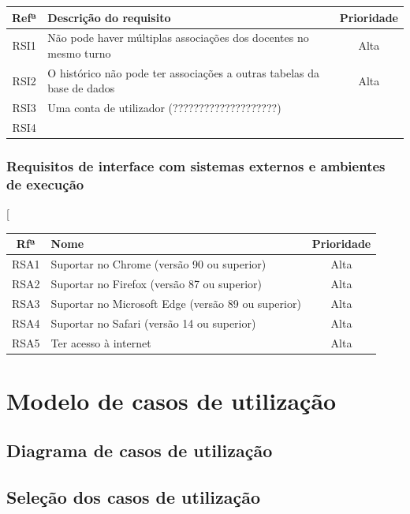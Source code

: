 \documentclass[11pt, twoside]{report}
\begin{document}
	
	\begin{center}	
	\begin{tabularx}{\textwidth}{|c|X|c|}
		\hline
		\textbf{Refª }	& \textbf{Descrição do requisito} & \textbf{Prioridade} \\
		\hline
		RSI1 &Não pode haver múltiplas associações dos docentes no mesmo turno &Alta\\
		\hline
		RSI2 &O histórico não pode ter associações a outras tabelas da base de dados  &Alta\\
		\hline
		RSI3 & Uma conta de utilizador (????????????????????)&\\
		\hline
		RSI4 & &\\
		\hline
	\end{tabularx}
	\label{requisitosdeseguranca}
\end{center}
	
	\subsection{Requisitos de interface com sistemas externos e ambientes de execução}
		\begin{center}[
		\begin{tabularx}{\textwidth}{|c|X|c|}
			\hline
			Rfª & Nome & Prioridade\\
			\hline
			RSA1 & Suportar no Chrome (versão 90 ou superior) &Alta\\
			\hline
			RSA2 &Suportar no Firefox (versão 87 ou superior) &Alta\\
			\hline
			RSA3 &Suportar no Microsoft Edge (versão 89 ou superior)&Alta\\
			\hline
			RSA4 &Suportar no Safari (versão 14 ou superior)&Alta\\
			\hline
			RSA5 &Ter acesso à internet&Alta\\
			\hline
		\end{tabularx}
		\label{requisitosdesistemas}
	\end{center}
	
	\chapter{Modelo de casos de utilização}
	\section{Diagrama de casos de utilização}
	\section{Seleção dos casos de utilização}
\end{document}
